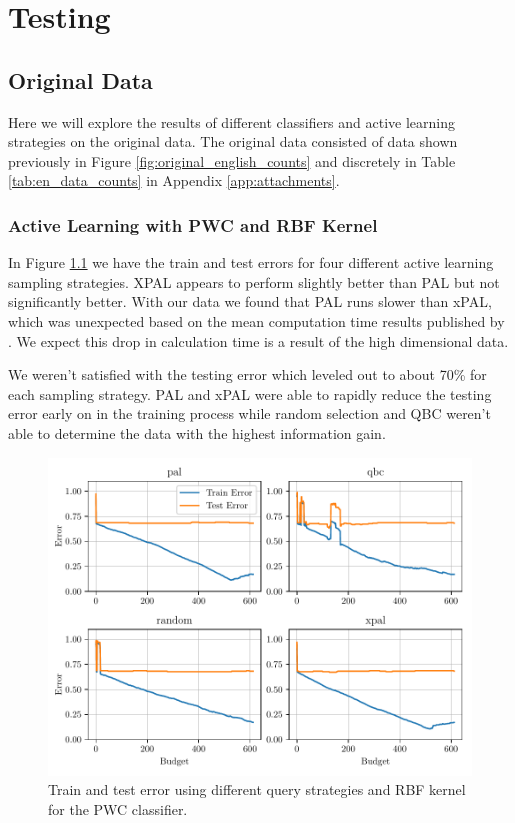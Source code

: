 \chapter{Testing}

\section{Original Data}

Here we will explore the results of different classifiers and active learning strategies on the original data. The original data consisted of data shown previously in Figure \ref{fig:original_english_counts} and discretely in Table \ref{tab:en_data_counts} in Appendix \ref{app:attachments}. 

\subsection{Active Learning with PWC and RBF Kernel}

In Figure \ref{fig:plot_all_results_rbf} we have the train and test errors for four different active learning sampling strategies. XPAL appears to perform slightly better than PAL but not significantly better. With our data we found that PAL runs slower than xPAL, which was unexpected based on the mean computation time results published by \cite{kottke2021toward}. We expect this drop in calculation time is a result of the high dimensional data.

We weren't satisfied with the testing error which leveled out to about 70\% for each sampling strategy. PAL and xPAL were able to rapidly reduce the testing error early on in the training process while random selection and QBC weren't able to determine the data with the highest information gain. 

\begin{figure}[ht]
  \centering
  \includegraphics[width=\scale\textwidth]{../img/plot_all_results_rbf.pdf}
  \caption{Train and test error using different query strategies and RBF kernel for the PWC classifier.}
  \label{fig:plot_all_results_rbf}
\end{figure}

